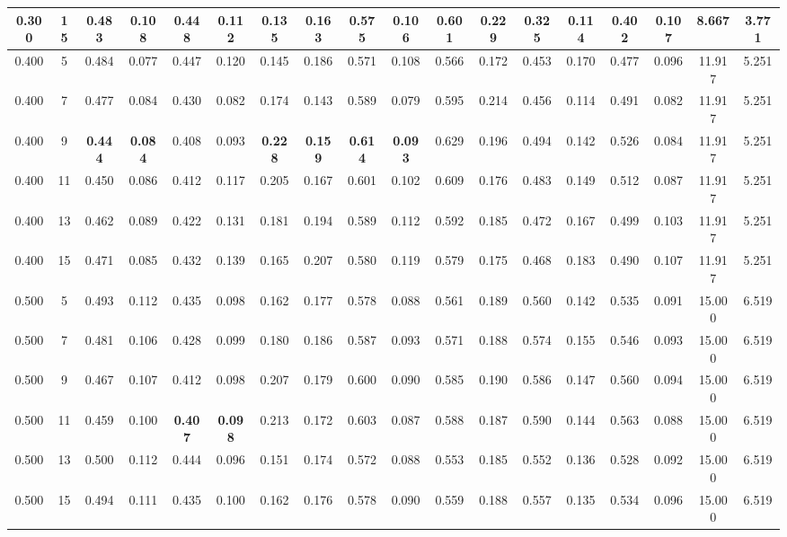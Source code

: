 \begin{longtable}[c]{|c|c|c|c|c|c|c|c|c|c|c|c|c|c|c|c|c|c|}
  0.300 & 15 & 0.483 & 0.108 & 0.448 & 0.112 & 0.135 & 0.163 & 0.575 & 0.106 & 0.601 & 0.229 & 0.325 & 0.114 & 0.402 & 0.107 & 8.667 & 3.771  \\ \hline 
  0.400 & 5 & 0.484 & 0.077 & 0.447 & 0.120 & 0.145 & 0.186 & 0.571 & 0.108 & 0.566 & 0.172 & 0.453 & 0.170 & 0.477 & 0.096 & 11.917 & 5.251  \\ \hline 
  0.400 & 7 & 0.477 & 0.084 & 0.430 & 0.082 & 0.174 & 0.143 & 0.589 & 0.079 & 0.595 & 0.214 & 0.456 & 0.114 & 0.491 & 0.082 & 11.917 & 5.251  \\ \hline 
  0.400 & 9 & \cellcolor{gray!20} \textbf{0.444} & \cellcolor{gray!20} \textbf{0.084} & 0.408 & 0.093 & \cellcolor{gray!20} \textbf{0.228} & \cellcolor{gray!20} \textbf{0.159} & \cellcolor{gray!20} \textbf{0.614} & \cellcolor{gray!20} \textbf{0.093} & 0.629 & 0.196 & 0.494 & 0.142 & 0.526 & 0.084 & 11.917 & 5.251  \\ \hline 
  0.400 & 11 & 0.450 & 0.086 & 0.412 & 0.117 & 0.205 & 0.167 & 0.601 & 0.102 & 0.609 & 0.176 & 0.483 & 0.149 & 0.512 & 0.087 & 11.917 & 5.251  \\ \hline 
  0.400 & 13 & 0.462 & 0.089 & 0.422 & 0.131 & 0.181 & 0.194 & 0.589 & 0.112 & 0.592 & 0.185 & 0.472 & 0.167 & 0.499 & 0.103 & 11.917 & 5.251  \\ \hline 
  0.400 & 15 & 0.471 & 0.085 & 0.432 & 0.139 & 0.165 & 0.207 & 0.580 & 0.119 & 0.579 & 0.175 & 0.468 & 0.183 & 0.490 & 0.107 & 11.917 & 5.251  \\ \hline 
  0.500 & 5 & 0.493 & 0.112 & 0.435 & 0.098 & 0.162 & 0.177 & 0.578 & 0.088 & 0.561 & 0.189 & 0.560 & 0.142 & 0.535 & 0.091 & 15.000 & 6.519  \\ \hline 
  0.500 & 7 & 0.481 & 0.106 & 0.428 & 0.099 & 0.180 & 0.186 & 0.587 & 0.093 & 0.571 & 0.188 & 0.574 & 0.155 & 0.546 & 0.093 & 15.000 & 6.519  \\ \hline 
  0.500 & 9 & 0.467 & 0.107 & 0.412 & 0.098 & 0.207 & 0.179 & 0.600 & 0.090 & 0.585 & 0.190 & 0.586 & 0.147 & 0.560 & 0.094 & 15.000 & 6.519  \\ \hline 
  0.500 & 11 & 0.459 & 0.100 & \cellcolor{gray!20} \textbf{0.407} & \cellcolor{gray!20} \textbf{0.098} & 0.213 & 0.172 & 0.603 & 0.087 & 0.588 & 0.187 & 0.590 & 0.144 & 0.563 & 0.088 & 15.000 & 6.519  \\ \hline 
  0.500 & 13 & 0.500 & 0.112 & 0.444 & 0.096 & 0.151 & 0.174 & 0.572 & 0.088 & 0.553 & 0.185 & 0.552 & 0.136 & 0.528 & 0.092 & 15.000 & 6.519  \\ \hline 
  0.500 & 15 & 0.494 & 0.111 & 0.435 & 0.100 & 0.162 & 0.176 & 0.578 & 0.090 & 0.559 & 0.188 & 0.557 & 0.135 & 0.534 & 0.096 & 15.000 & 6.519  \\ \hline 

\end{longtable}
